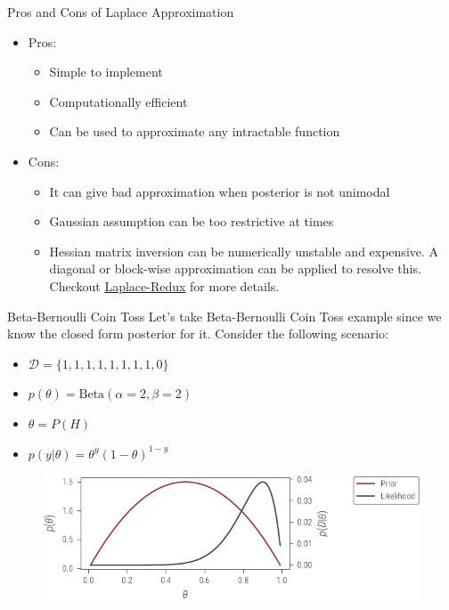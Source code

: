\documentclass{beamer}
\begin{document}
\begin{frame}{Pros and Cons of Laplace Approximation}
    \begin{itemize}
        \item Pros:
              \begin{itemize}
                  \item Simple to implement
                  \item Computationally efficient
                  \item Can be used to approximate any intractable function
              \end{itemize}
              \pause
        \item Cons:
              \begin{itemize}
                  \item It can give bad approximation when posterior is not unimodal
                  \item Gaussian assumption can be too restrictive at times
                  \item Hessian matrix inversion can be numerically unstable and expensive. A diagonal or block-wise approximation can be applied to resolve this. Checkout \href{https://github.com/AlexImmer/Laplace}{Laplace-Redux} for more details.
              \end{itemize}
    \end{itemize}

\end{frame}

\begin{frame}{Beta-Bernoulli Coin Toss}
    Let's take Beta-Bernoulli Coin Toss example since we know the closed form posterior for it. Consider the following scenario:
    \pause
    \begin{itemize}
        \item $\mathcal{D} = \{1, 1, 1, 1, 1, 1, 1, 1, 0\}$
        \item $p(\theta) = \text{Beta}(\alpha=2, \beta=2)$
        \item $\theta = P(H)$
        \item $p(y|\theta) = \theta^y(1-\theta)^{1-y}$
    \end{itemize}
    \pause
    \begin{figure}
        \includegraphics[]{../figures/laplace-approx/beta-prior-coin-toss.pdf}
    \end{figure}
\end{frame}
\end{document}
